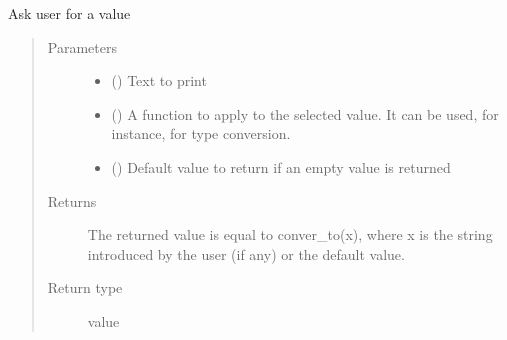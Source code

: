 \documentclass[letterpaper,10pt,english]{sphinxmanual}
\begin{document}
\begin{fulllineitems}
\begin{fulllineitems}
\begin{quote}
\begin{description}
\end{description}\end{quote}

\end{fulllineitems}


\begin{fulllineitems}
\label{\detokenize{dc_query_manager:src.query_manager.QueryManager.ask_value}}
\sphinxAtStartPar
Ask user for a value
\begin{quote}\begin{description}
\item[{Parameters}] \leavevmode\begin{itemize}
\item {} 
\sphinxAtStartPar
{} () \textendash{} Text to print

\item {} 
\sphinxAtStartPar
{} () \textendash{} A function to apply to the selected value. It can be used, for
instance, for type conversion.

\item {} 
\sphinxAtStartPar
{} () \textendash{} Default value to return if an empty value is returned

\end{itemize}

\item[{Returns}] \leavevmode
\sphinxAtStartPar
The returned value is equal to conver\_to(x), where x is the string
introduced by the user (if any) or the default value.

\item[{Return type}] \leavevmode
\sphinxAtStartPar
value

\end{description}\end{quote}

\end{fulllineitems}


\end{fulllineitems}
\end{document}
